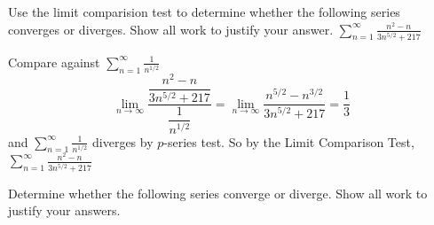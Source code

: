 \documentclass[12pt,answers]{exam}
\begin{document}
\begin{questions}

\question[7]
Use the limit comparision test to determine whether the following series converges or diverges. Show all work to justify your answer.
$\displaystyle \sum_{n=1}^{\infty} \frac{n^2-n}{3n^{5/2} + 217}$
\begin{solution}
    Compare against $\displaystyle \sum_{n=1}^\infty \frac{1}{n^{1/2}}$
    \[
        \lim_{n\to\infty} \frac{\dfrac{n^2-n}{3n^{5/2} + 217}}{\dfrac{1}{n^{1/2}}}
        = 
        \lim_{n\to\infty} \frac{n^{5/2}-n^{3/2}}{3n^{5/2} + 217} = \frac 13
    \]
    and $\displaystyle \sum_{n=1}^\infty \frac{1}{n^{1/2}}$ diverges by $p$-series test. 
    So by the Limit Comparison Test, \\
$\displaystyle \sum_{n=1}^{\infty} \frac{n^2-n}{3n^{5/2} + 217}$ 
\end{solution}

\newpage
\question
Determine whether the following series converge or diverge. Show all work to justify your answers.
\begin{parts}

\end{parts}
\end{questions}
\end{document}
